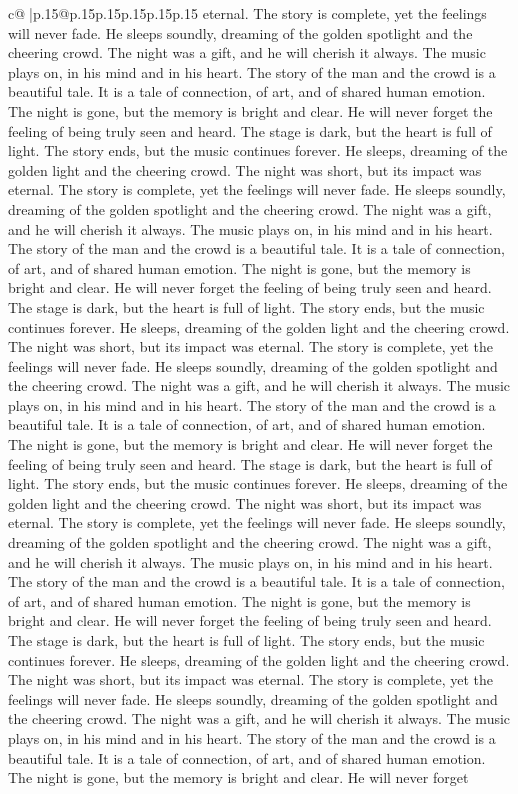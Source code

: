 \documentclass{article}
\begin{document}
{\begin{supertabular}{c@{$\;$}|p{.15\linewidth}@{}p{.15\linewidth}p{.15\linewidth}p{.15\linewidth}p{.15\linewidth}p{.15\linewidth}}
{{{eternal. The story is complete, yet the feelings will never fade. He sleeps soundly, dreaming of the golden spotlight and the cheering crowd. The night was a gift, and he will cherish it always. The music plays on, in his mind and in his heart. The story of the man and the crowd is a beautiful tale. It is a tale of connection, of art, and of shared human emotion. The night is gone, but the memory is bright and clear. He will never forget the feeling of being truly seen and heard. The stage is dark, but the heart is full of light. The story ends, but the music continues forever. He sleeps, dreaming of the golden light and the cheering crowd. The night was short, but its impact was eternal. The story is complete, yet the feelings will never fade. He sleeps soundly, dreaming of the golden spotlight and the cheering crowd. The night was a gift, and he will cherish it always. The music plays on, in his mind and in his heart. The story of the man and the crowd is a beautiful tale. It is a tale of connection, of art, and of shared human emotion. The night is gone, but the memory is bright and clear. He will never forget the feeling of being truly seen and heard. The stage is dark, but the heart is full of light. The story ends, but the music continues forever. He sleeps, dreaming of the golden light and the cheering crowd. The night was short, but its impact was eternal. The story is complete, yet the feelings will never fade. He sleeps soundly, dreaming of the golden spotlight and the cheering crowd. The night was a gift, and he will cherish it always. The music plays on, in his mind and in his heart. The story of the man and the crowd is a beautiful tale. It is a tale of connection, of art, and of shared human emotion. The night is gone, but the memory is bright and clear. He will never forget the feeling of being truly seen and heard. The stage is dark, but the heart is full of light. The story ends, but the music continues forever. He sleeps, dreaming of the golden light and the cheering crowd. The night was short, but its impact was eternal. The story is complete, yet the feelings will never fade. He sleeps soundly, dreaming of the golden spotlight and the cheering crowd. The night was a gift, and he will cherish it always. The music plays on, in his mind and in his heart. The story of the man and the crowd is a beautiful tale. It is a tale of connection, of art, and of shared human emotion. The night is gone, but the memory is bright and clear. He will never forget the feeling of being truly seen and heard. The stage is dark, but the heart is full of light. The story ends, but the music continues forever. He sleeps, dreaming of the golden light and the cheering crowd. The night was short, but its impact was eternal. The story is complete, yet the feelings will never fade. He sleeps soundly, dreaming of the golden spotlight and the cheering crowd. The night was a gift, and he will cherish it always. The music plays on, in his mind and in his heart. The story of the man and the crowd is a beautiful tale. It is a tale of connection, of art, and of shared human emotion. The night is gone, but the memory is bright and clear. He will never forget }}}
\end{supertabular}}
\end{document}
